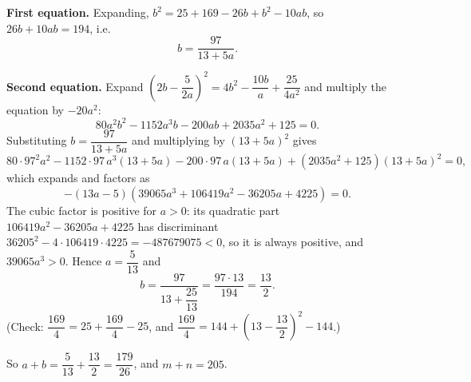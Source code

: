 \textbf{First equation.} Expanding, $b^2=25+169-26b+b^2-10ab$, so $26b+10ab=194$, i.e.
\[b=\dfrac{97}{13+5a}.\]

\textbf{Second equation.} Expand $\left(2b-\dfrac{5}{2a}\right)^2=4b^2-\dfrac{10b}{a}+\dfrac{25}{4a^2}$ and multiply the equation by $-20a^2$:
\[80a^2b^2-1152a^3b-200ab+2035a^2+125=0.\]
Substituting $b=\dfrac{97}{13+5a}$ and multiplying by $(13+5a)^2$ gives
\[80\cdot97^2a^2-1152\cdot97\,a^3(13+5a)-200\cdot97\,a(13+5a)+\left(2035a^2+125\right)(13+5a)^2=0,\]
which expands and factors as
\[-(13a-5)\left(39065a^3+106419a^2-36205a+4225\right)=0.\]
The cubic factor is positive for $a>0$: its quadratic part $106419a^2-36205a+4225$ has discriminant $36205^2-4\cdot106419\cdot4225=-487679075<0$, so it is always positive, and $39065a^3>0$. Hence $a=\dfrac{5}{13}$ and
\[b=\dfrac{97}{13+\dfrac{25}{13}}=\dfrac{97\cdot13}{194}=\dfrac{13}{2}.\]
(Check: $\dfrac{169}{4}=25+\dfrac{169}{4}-25$, and $\dfrac{169}{4}=144+\left(13-\dfrac{13}{2}\right)^2-144$.)

So $a+b=\dfrac5{13}+\dfrac{13}{2}=\dfrac{179}{26}$, and $m+n=\boxed{205}$.
